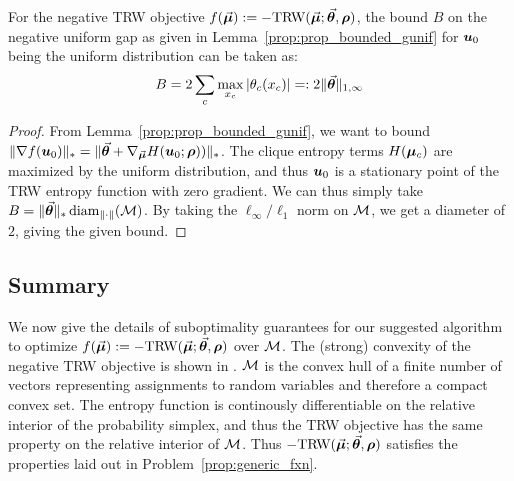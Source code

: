 \begin{lemma}
	\label{lem:bounded_gu0}
For the negative TRW objective $f(\vec{\bm{\mu}}) := -\text{TRW}(\vec{\bm{\mu}};\vec{\bm{\theta}},\bm{\rho})$, the bound $B$ on the negative uniform gap as given in Lemma~\ref{prop:prop_bounded_gunif} for $\bm{u}_0$ being the uniform distribution can be taken as:
\begin{equation} \label{eq:uniformBoundTRW}
	B =  2\sum_{c} \max_{x_c} |\theta_c(x_c)| =: 2 \|\vec{\bm{\theta}} \|_{1, \infty}
\end{equation}
\end{lemma}
\begin{proof}
	From Lemma~\ref{prop:prop_bounded_gunif}, we want to bound 
	$\| \nabla f(\bm{u}_0) \|_* = \| \vec{\bm{\theta}} + \nabla_{\vec{\bm{\mu}}} H(\bm{u}_0;\bm{\rho})) \|_*$. The clique entropy terms $H(\bm{\mu}_c)$ are maximized by the uniform distribution, and thus $\bm{u}_0$ is a stationary point of the TRW entropy function with zero gradient. We can thus simply take $B = \|\vec{\bm{\theta}}\|_* \operatorname{diam}_{\| \cdot \|} (\mathcal{M})$. By taking the $\ell_\infty / \ell_1$ norm on $\mathcal{M}$, we get a diameter of $2$, giving the given bound.
\end{proof}



\subsection{Summary}

%
%
We now give the details of suboptimality guarantees for our suggested algorithm to optimize $f(\vec{\bm{\mu}}) := -\text{TRW}(\vec{\bm{\mu}};\vec{\bm{\theta}},\bm{\rho})$ over $\mathcal{M}$.
The (strong) convexity of the negative TRW objective is shown in \citep{wainwright2005new,london_icml15}. 
$\mathcal{M}$ is the convex hull of a finite number of vectors representing assignments to random variables and therefore a compact convex set. The entropy function is continously differentiable on the relative interior of the probability simplex, and thus the TRW objective has the same property on the relative interior of $\mathcal{M}$. Thus $-\text{TRW}(\vec{\bm{\mu}};\vec{\bm{\theta}},\bm{\rho})$ satisfies the properties laid out in Problem~\ref{prop:generic_fxn}.

%
%
%
%
%
%
%
%
%
%
%

